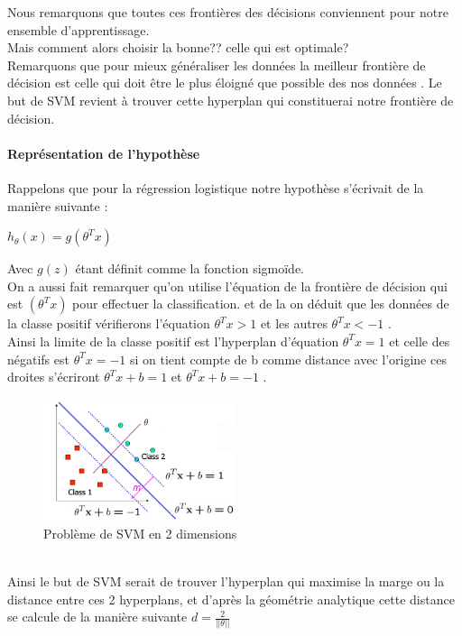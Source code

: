 Nous remarquons que toutes ces frontières des décisions conviennent pour notre ensemble d'apprentissage.\\ Mais comment alors choisir la bonne?? celle qui est optimale?\\
Remarquons que pour mieux généraliser les données la meilleur  frontière de décision est celle qui doit être le plus éloigné que possible des nos données .  
Le but de SVM revient à trouver cette hyperplan qui constituerai notre frontière de décision.
\paragraph{Représentation de l'hypothèse }
Rappelons que pour la régression logistique notre hypothèse s'écrivait de la manière suivante :
\begin{center}
	${h}_{\theta}\left(x\right)=g({\theta }^{T}{x})$
\end{center} Avec $g(z)$ étant définit comme la fonction sigmoïde.\\
On a aussi fait remarquer qu'on utilise l'équation de la frontière  de décision qui est $({\theta }^{T}{x})$ pour effectuer la classification.
et de la on déduit que les données de la classe positif vérifierons l'équation ${\theta }^{T}{x} > 1$ et les autres ${\theta }^{T}{x} <-1$ .\\
Ainsi la limite de la classe positif est l'hyperplan d'équation  ${\theta }^{T}{x} = 1$  et celle des négatifs est ${\theta }^{T}{x} =-1$ si on tient compte de b comme distance avec l'origine ces droites s'écriront 
${\theta }^{T}{x} + b = 1$  et ${\theta }^{T}{x} + b=- 1$ .
 \begin{figure}[ht]
 	\centering
 	\includegraphics[width=0.5\textwidth]{fig/SVN2D.png}
 	\caption{Problème de SVM en 2 dimensions  }
 	\label{fig:image14}
 \end{figure}\\
Ainsi le but de SVM serait de trouver l'hyperplan qui maximise la marge ou la distance  entre ces 2  hyperplans, et d'après la géométrie analytique cette distance se calcule de la manière suivante $d =\frac{2}{||\theta||}$
